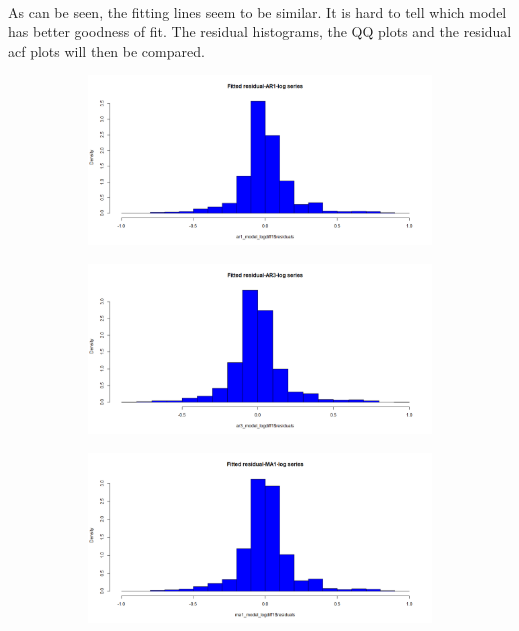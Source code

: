 \documentclass[12pt]{article}
\begin{document}
\paragraph{}
As can be seen, the fitting lines seem to be similar. It is hard to tell which model has better goodness of fit. The residual histograms, the QQ plots and the residual acf plots will then be compared. 
\begin{figure}[H]
  \centering
  \begin{subfigure}[b]{0.49\linewidth}
    \includegraphics[width=\linewidth]{figure11-1.png}
  \end{subfigure}
  \begin{subfigure}[b]{0.49\linewidth}
    \includegraphics[width=\linewidth]{figure11-2.png}
  \end{subfigure}
  \begin{subfigure}[b]{0.49\linewidth}
    \includegraphics[width=\linewidth]{figure11-3.png}

\end{subfigure}
\end{figure}
\end{document}
